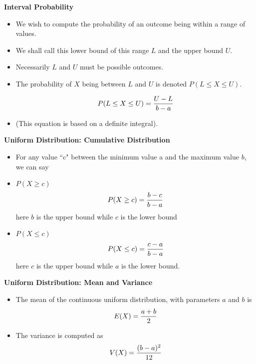 {\textbf{Interval Probability}

\begin{itemize}
\item We wish to compute the probability of an outcome being within a range of values.
\item We shall call this lower bound of this range $L$ and the upper bound $ U$.
\item Necessarily $L$ and $U$ must be possible outcomes.
\item The probability of $X$ being between $L$ and $U$ is denoted $P( L \leq X \leq U )$.

\[
P( L \leq X \leq U ) = { U - L \over b - a}
\]
\item (This equation is based on a definite integral).
\end{itemize}
}

{
\textbf{Uniform Distribution: Cumulative Distribution}
\begin{itemize}

\item For any value ``c" between the minimum value a and the maximum
value $b$, we can say
\item $P(X \geq c)$ \[P(X \geq c) = {b-c \over b-a}\]
here $b$ is the upper bound while $c$ is the lower bound
\item $P(X \leq c)$ \[P(X \leq c) = {c-a \over b-a}\]
here $c$ is the upper bound while $a$ is the lower bound.
\end{itemize}
}

{
\textbf{Uniform Distribution: Mean and Variance}
\begin{itemize}
\item The mean of the continuous uniform distribution, with parameters $a$ and $b$ is
\[ E(X) = {a+b \over 2}\]
\item The variance is computed as
\[ V(X) = {(b-a)^2 \over 12}\]
\end{itemize}
}


